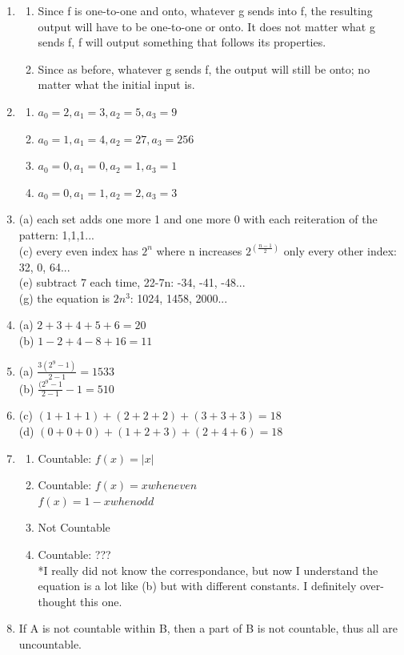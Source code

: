 \documentclass{article}
\begin{document}
\begin{enumerate}
\item
 \begin{enumerate}
 \item Since f is one-to-one and onto, whatever g sends into f, the resulting output will have to be one-to-one or onto. It does not matter what g sends f, f will output something that follows its properties.
 \item Since as before, whatever g sends f, the output will still be onto; no matter what the initial input is.
 \end{enumerate}

\item
 \begin{enumerate}
 \item $a_0 = 2, a_1 = 3, a_2 = 5, a_3 = 9$
 \item $a_0 = 1, a_1 = 4, a_2 = 27, a_3 = 256$
 \item $a_0 = 0, a_1 = 0, a_2 = 1, a_3 = 1$
 \item $a_0 = 0, a_1 = 1, a_2 = 2, a_3 = 3$
 \end{enumerate}

\item
 (a) each set adds one more 1 and one more 0 with each reiteration of the pattern: 1,1,1... \\
 (c) every even index has $2^n$ where n increases $2^{(\frac{n-1}{2})}$ only every other index: 32, 0, 64... \\
 (e) subtract 7 each time, 22-7n: -34, -41, -48... \\
 (g) the equation is $2n^3$: 1024, 1458, 2000...

\item 
 (a) $2+3+4+5+6= 20$  \\
 (b) $1-2+4-8+16= 11$

\item
 (a) $\frac{3(2^9-1)}{2-1} = 1533$ \\
 (b) $\frac{(2^9-1}{2-1} -1 = 510$ 

\item
 (c) $(1+1+1)+(2+2+2)+(3+3+3)=18$ \\
 (d) $(0+0+0)+(1+2+3)+(2+4+6)=18$

\item
 \begin{enumerate}
 \item Countable: $f(x)= |x|$
 \item Countable: $f(x) = x when even$ \\
                  $f(x) = 1-x when odd$
 \item Not Countable
 \item Countable: ??? \\
   *I really did not know the correspondance, but now I understand the equation is a lot like (b) but with different constants. I definitely over-thought this one.
 \end{enumerate}

\item If A is not countable within B, then a part of B is not countable, thus all are uncountable.

\end{enumerate}
\end{document}
